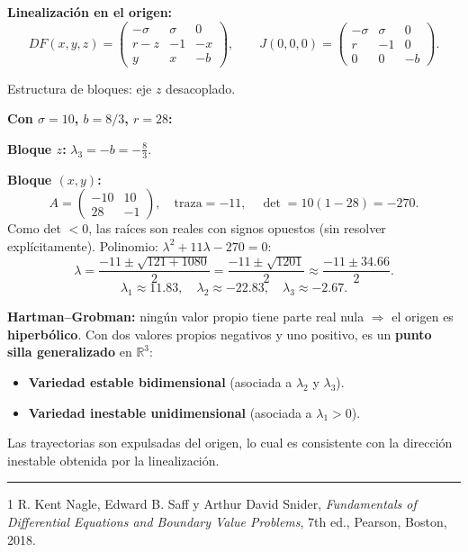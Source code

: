 \documentclass[12pt,letterpaper]{article}
\begin{document}
\textbf{Linealización en el origen:}
\[
  DF(x,y,z)=\begin{pmatrix}-\sigma&\sigma&0\\r-z&-1&-x\\y&x&-b\end{pmatrix},
  \qquad
  \boxed{J(0,0,0)=\begin{pmatrix}-\sigma&\sigma&0\\r&-1&0\\0&0&-b\end{pmatrix}.}
\]

Estructura de bloques: eje $z$ desacoplado.

\textbf{Con $\sigma=10$, $b=8/3$, $r=28$:}

\textbf{Bloque $z$:} $\lambda_3=-b=-\tfrac83$.

\textbf{Bloque $(x,y)$:}
\[
  A=\begin{pmatrix}-10&10\\28&-1\end{pmatrix},\quad
  \text{traza}=-11,\quad \det=10(1-28)=-270.
\]
Como det $<0$, las raíces son reales con signos opuestos (sin resolver explícitamente).
Polinomio: $\lambda^2+11\lambda-270=0$:
\[
  \lambda=\frac{-11\pm\sqrt{121+1080}}{2}=\frac{-11\pm\sqrt{1201}}{2}
  \approx \frac{-11\pm34.66}{2}.
\]
\[
  \boxed{\lambda_1\approx11.83,\quad \lambda_2\approx-22.83,\quad \lambda_3\approx-2.67.}
\]

\textbf{Hartman--Grobman:} ningún valor propio tiene parte real nula $\Rightarrow$ el origen es
\textbf{hiperbólico}. Con dos valores propios negativos y uno positivo, es un \textbf{punto silla
generalizado} en $\mathbb{R}^3$:
\begin{itemize}
  \item \textbf{Variedad estable bidimensional} (asociada a $\lambda_2$ y $\lambda_3$).
  \item \textbf{Variedad inestable unidimensional} (asociada a $\lambda_1>0$).
\end{itemize}
Las trayectorias son expulsadas del origen, lo cual es consistente con la dirección inestable
obtenida por la linealización.

\bigskip
\noindent\rule{\textwidth}{0.5pt}

\begin{thebibliography}{1}
R. Kent Nagle, Edward B. Saff y Arthur David Snider,
\textit{Fundamentals of Differential Equations and Boundary Value Problems},
7th ed., Pearson, Boston, 2018.
\end{thebibliography}
\end{document}
